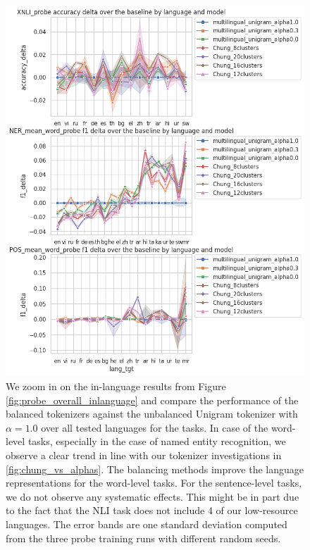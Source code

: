 \begin{figure}[H]
    \centering
    \includegraphics[width=\textwidth]{img/temp/probe_overall_inlanguage_over_baseline.png}
    \caption{We zoom in on the in-language results from Figure \ref{fig:probe_overall_inlanguage} and compare the performance of the balanced tokenizers against the unbalanced Unigram tokenizer with $\alpha=1.0$ over all tested languages for the tasks. In case of the word-level tasks, especially in the case of named entity recognition, we observe a clear trend in line with our tokenizer investigations in \ref{fig:chung_vs_alphas}. The balancing methods improve the language representations for the word-level tasks. For the sentence-level tasks, we do not observe any systematic effects. This might be in part due to the fact that the NLI task does not include 4 of our low-resource languages. The error bands are one standard deviation computed from the three probe training runs with different random seeds.}
    \label{fig:probe_overall_inlanguage_over_baseline}
\end{figure}


